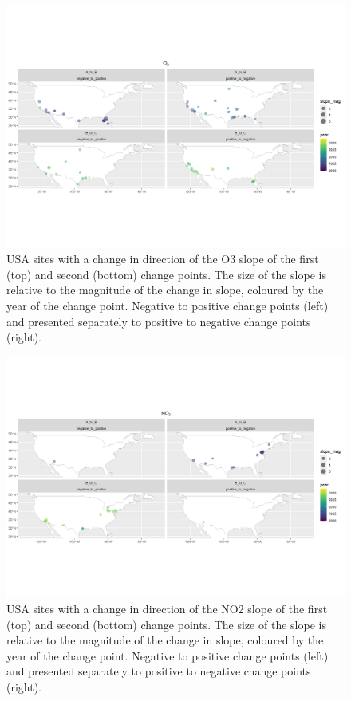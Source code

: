 \documentclass[journal abbreviation, manuscript]{copernicus}
\begin{document}
\begin{figure}[t]
\includegraphics[width=12cm]{plots/US_o3_tau_0.5_changepoint_year_mag_map.png}
\caption{USA sites with a change in direction of the O3 slope of the first (top) and second (bottom) change points. The size of the slope is relative to the magnitude of the change in slope, coloured by the year of the change point. Negative to positive change points (left) and presented separately to positive to negative change points (right).}
\label{us_o3_changepoint_map}
\end{figure}

\begin{figure}[t]
\includegraphics[width=12cm]{plots/US_no2_tau_0.5_changepoint_year_mag_map.png}
\caption{USA sites with a change in direction of the NO2 slope of the first (top) and second (bottom) change points. The size of the slope is relative to the magnitude of the change in slope, coloured by the year of the change point. Negative to positive change points (left) and presented separately to positive to negative change points (right).}
\label{us_no2_changepoint_map}
\end{figure}
\end{document}
